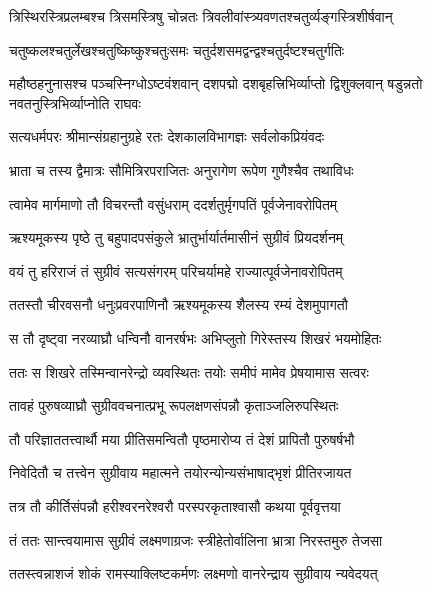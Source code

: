 \twolineshloka
{त्रिस्थिरस्त्रिप्रलम्बश्च त्रिसमस्त्रिषु चोन्नतः}
{त्रिवलीवांस्त्र्यवणतश्चतुर्व्यङ्गस्त्रिशीर्षवान्} %

\twolineshloka
{चतुष्कलश्चतुर्लेखश्चतुष्किष्कुश्चतुःसमः}
{चतुर्दशसमद्वन्द्वश्चतुर्दष्टश्चतुर्गतिः} %

\threelineshloka
{महौष्ठहनुनासश्च पञ्चस्निग्धोऽष्टवंशवान्}
{दशपद्मो दशबृहत्त्रिभिर्व्याप्तो द्विशुक्लवान्}
{षडुन्नतो नवतनुस्त्रिभिर्व्याप्नोति राघवः} %

\twolineshloka
{सत्यधर्मपरः श्रीमान्संग्रहानुग्रहे रतः}
{देशकालविभागज्ञः सर्वलोकप्रियंवदः} %

\twolineshloka
{भ्राता च तस्य द्वैमात्रः सौमित्रिरपराजितः}
{अनुरागेण रूपेण गुणैश्चैव तथाविधः} %

\twolineshloka
{त्वामेव मार्गमाणो तौ विचरन्तौ वसुंधराम्}
{ददर्शतुर्मृगपतिं पूर्वजेनावरोपितम्} %

\twolineshloka
{ऋश्यमूकस्य पृष्ठे तु बहुपादपसंकुले}
{भ्रातुर्भार्यार्तमासीनं सुग्रीवं प्रियदर्शनम्} %

\twolineshloka
{वयं तु हरिराजं तं सुग्रीवं सत्यसंगरम्}
{परिचर्यामहे राज्यात्पूर्वजेनावरोपितम्} %

\twolineshloka
{ततस्तौ चीरवसनौ धनुःप्रवरपाणिनौ}
{ऋश्यमूकस्य शैलस्य रम्यं देशमुपागतौ} %

\twolineshloka
{स तौ दृष्ट्वा नरव्याघ्रौ धन्विनौ वानरर्षभः}
{अभिप्लुतो गिरेस्तस्य शिखरं भयमोहितः} %

\twolineshloka
{ततः स शिखरे तस्मिन्वानरेन्द्रो व्यवस्थितः}
{तयोः समीपं मामेव प्रेषयामास सत्वरः} %

\twolineshloka
{तावहं पुरुषव्याघ्रौ सुग्रीववचनात्प्रभू}
{रूपलक्षणसंपन्नौ कृताञ्जलिरुपस्थितः} %

\twolineshloka
{तौ परिज्ञाततत्त्वार्थौ मया प्रीतिसमन्वितौ}
{पृष्ठमारोप्य तं देशं प्रापितौ पुरुषर्षभौ} %

\twolineshloka
{निवेदितौ च तत्त्वेन सुग्रीवाय महात्मने}
{तयोरन्योन्यसंभाषाद्भृशं प्रीतिरजायत} %

\twolineshloka
{तत्र तौ कीर्तिसंपन्नौ हरीश्वरनरेश्वरौ}
{परस्परकृताश्वासौ कथया पूर्ववृत्तया} %

\twolineshloka
{तं ततः सान्त्वयामास सुग्रीवं लक्ष्मणाग्रजः}
{स्त्रीहेतोर्वालिना भ्रात्रा निरस्तमुरु तेजसा} %

\twolineshloka
{ततस्त्वन्नाशजं शोकं रामस्याक्लिष्टकर्मणः}
{लक्ष्मणो वानरेन्द्राय सुग्रीवाय न्यवेदयत्} %

